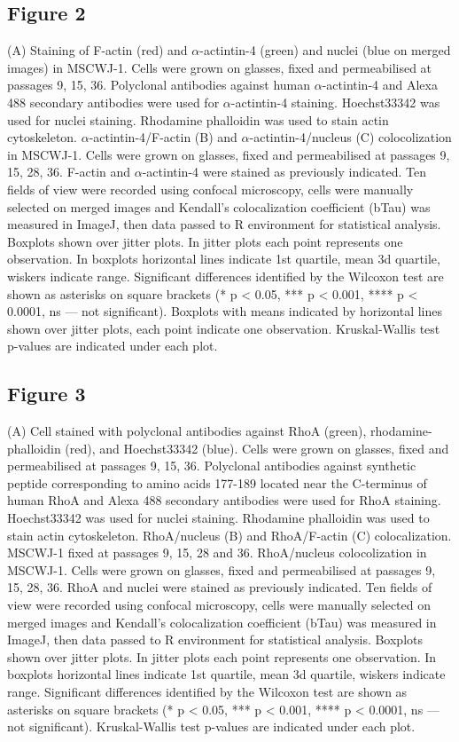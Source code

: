\documentclass[alpha-refs]{wiley-article}
\begin{document}
\subsection*{Figure 2}
(A) Staining of F-actin (red) and $\alpha$-actintin-4 (green) and nuclei (blue on merged images) in MSCWJ-1.
Cells were grown on glasses, fixed and permeabilised at passages 9, 15, 36.
Polyclonal antibodies against human $\alpha$-actintin-4 and Alexa 488 secondary antibodies were used for $\alpha$-actintin-4 staining.
Hoechst33342 was used for nuclei staining.
Rhodamine phalloidin was used to stain actin cytoskeleton.
$\alpha$-actintin-4/F-actin (B) and $\alpha$-actintin-4/nucleus (C) colocolization in MSCWJ-1.
Cells were grown on glasses, fixed and permeabilised at passages 9, 15, 28, 36.
F-actin and $\alpha$-actintin-4 were stained as previously indicated.
Ten fields of view were recorded using confocal microscopy, cells were manually selected on merged images and Kendall's colocalization coefficient (bTau) was measured in ImageJ, then data passed to R environment for statistical analysis.
Boxplots shown over jitter plots.
In jitter plots each point represents one observation.
In boxplots horizontal lines indicate 1st quartile, mean 3d quartile, wiskers indicate range.
Significant differences identified by the Wilcoxon test are shown as asterisks on square brackets (* p < 0.05, *** p < 0.001, **** p < 0.0001, ns --- not significant).
Boxplots with means indicated by horizontal lines shown over jitter plots, each point indicate one observation.
Kruskal-Wallis test p-values are indicated under each plot.

\subsection*{Figure 3}
(A) Cell stained with polyclonal antibodies against RhoA (green), rhodamine-phalloidin (red), and Hoechst33342 (blue).
Cells were grown on glasses, fixed and permeabilised at passages 9, 15, 36.
Polyclonal antibodies against synthetic peptide corresponding to amino acids 177-189 located near the C-terminus of human RhoA and Alexa 488 secondary antibodies were used for RhoA staining.
Hoechst33342 was used for nuclei staining.
Rhodamine phalloidin was used to stain actin cytoskeleton.
RhoA/nucleus (B) and RhoA/F-actin  (C) colocalization.
MSCWJ-1 fixed at passages 9, 15, 28 and 36.
RhoA/nucleus colocolization in MSCWJ-1.
Cells were grown on glasses, fixed and permeabilised at passages 9, 15, 28, 36.
RhoA and nuclei were stained as previously indicated.
Ten fields of view were recorded using confocal microscopy, cells were manually selected on merged images and Kendall's colocalization coefficient (bTau) was measured in ImageJ, then data passed to R environment for statistical analysis.
Boxplots shown over jitter plots.
In jitter plots each point represents one observation.
In boxplots horizontal lines indicate 1st quartile, mean 3d quartile, wiskers indicate range.
Significant differences identified by the Wilcoxon test are shown as asterisks on square brackets (* p < 0.05, *** p < 0.001, **** p < 0.0001, ns --- not significant).
Kruskal-Wallis test p-values are indicated under each plot.
\end{document}

